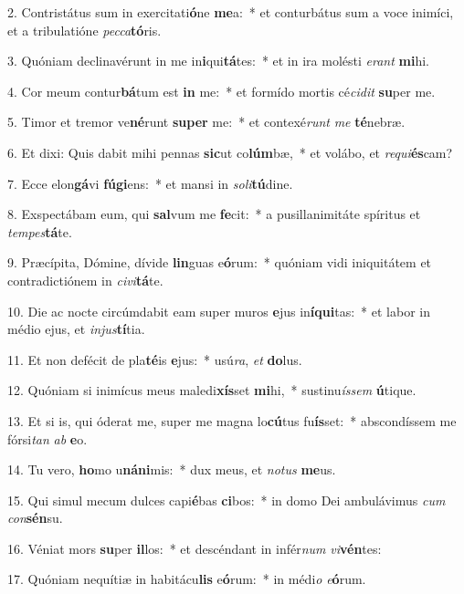 2. Contristátus sum in exercitati\textbf{ó}ne \textbf{me}a:~*  et conturbátus sum a voce inimíci, et a tribulatióne \textit{pec}\textit{ca}\textbf{tó}ris.\

3. Quóniam declinavérunt in me in\textbf{i}qui\textbf{tá}tes:~*  et in ira molésti \textit{e}\textit{rant} \textbf{mi}hi.\

4. Cor meum contur\textbf{bá}tum est \textbf{in} me:~*  et formído mortis cé\textit{ci}\textit{dit} \textbf{su}per me.\

5. Timor et tremor ve\textbf{né}runt \textbf{su}\textbf{per} me:~*  et contexé\textit{runt} \textit{me} \textbf{té}nebræ.\

6. Et dixi: Quis dabit mihi pennas \textbf{sic}ut co\textbf{lúm}bæ,~*  et volábo, et \textit{re}\textit{qui}\textbf{és}cam?\

7. Ecce elon\textbf{gá}vi \textbf{fú}\textbf{gi}ens:~*  et mansi in \textit{so}\textit{li}\textbf{tú}dine.\

8. Exspectábam eum, qui \textbf{sal}vum me \textbf{fe}cit:~*  a pusillanimitáte spíritus et \textit{tem}\textit{pes}\textbf{tá}te.\

9. Præcípita, Dómine, dívide \textbf{lin}guas e\textbf{ó}rum:~*  quóniam vidi iniquitátem et contradictiónem in \textit{ci}\textit{vi}\textbf{tá}te.\

10. Die ac nocte circúmdabit eam super muros \textbf{e}jus in\textbf{í}\textbf{qui}tas:~*  et labor in médio ejus, et \textit{in}\textit{jus}\textbf{tí}tia.\

11. Et non defécit de pla\textbf{té}is \textbf{e}jus:~*  usú\textit{ra}, \textit{et} \textbf{do}lus.\

12. Quóniam si inimícus meus maledi\textbf{xís}set \textbf{mi}hi,~*  sustinu\textit{ís}\textit{sem} \textbf{ú}tique.\

13. Et si is, qui óderat me, super me magna lo\textbf{cú}tus fu\textbf{ís}set:~*  abscondíssem me fórsi\textit{tan} \textit{ab} \textbf{e}o.\

14. Tu vero, \textbf{ho}mo u\textbf{ná}\textbf{ni}mis:~*  dux meus, et \textit{no}\textit{tus} \textbf{me}us.\

15. Qui simul mecum dulces capi\textbf{é}bas \textbf{ci}bos:~*  in domo Dei ambulávimus \textit{cum} \textit{con}\textbf{sén}su.\

16. Véniat mors \textbf{su}per \textbf{il}los:~*  et descéndant in infér\textit{num} \textit{vi}\textbf{vén}tes:\

17. Quóniam nequítiæ in habitácu\textbf{lis} e\textbf{ó}rum:~*  in médi\textit{o} \textit{e}\textbf{ó}rum.\

